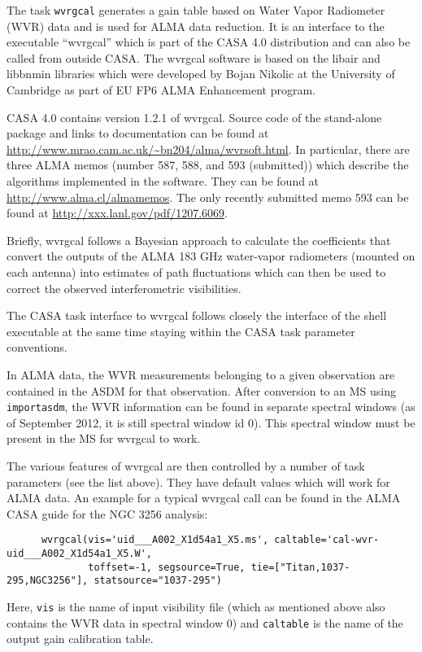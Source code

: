 The task {\tt wvrgcal} generates a gain table based on Water Vapor
Radiometer (WVR) data and is used for ALMA data reduction. It is an
interface to the executable ``wvrgcal'' which is part of the CASA 4.0
distribution and can also be called from outside CASA. The wvrgcal
software is based on the libair and libbnmin libraries which were
developed by Bojan Nikolic at the University of Cambridge as part of
EU FP6 ALMA Enhancement program.

CASA 4.0 contains version 1.2.1 of wvrgcal. Source code of the
stand-alone package and links to documentation can be found at
\url{http://www.mrao.cam.ac.uk/\~bn204/alma/wvrsoft.html}. In
particular, there are three ALMA memos (number 587, 588, and 593
(submitted)) which describe the algorithms implemented in the
software. They can be found at \url{http://www.alma.cl/almamemos}.
The only recently submitted memo 593 can be found at
\url{http://xxx.lanl.gov/pdf/1207.6069}.

Briefly, wvrgcal follows a Bayesian approach to calculate the
coefficients that convert the outputs of the ALMA 183 GHz water-vapor
radiometers (mounted on each antenna) into estimates of path
fluctuations which can then be used to correct the observed
interferometric visibilities.

The CASA task interface to wvrgcal follows closely the interface of
the shell executable at the same time staying within the CASA task
parameter conventions.

In ALMA data, the WVR measurements belonging to a given observation
are contained in the ASDM for that observation. After conversion to an
MS using {\tt importasdm}, the WVR information can be found in
separate spectral windows (as of September 2012, it is still spectral
window id 0).  This spectral window must be present in the MS for
wvrgcal to work.

The various features of wvrgcal are then controlled by a number of
task parameters (see the list above).  They have default values which
will work for ALMA data.  An example for a typical wvrgcal call can be
found in the ALMA CASA guide for the NGC 3256 analysis:

\small
\begin{verbatim}
      wvrgcal(vis='uid___A002_X1d54a1_X5.ms', caltable='cal-wvr-uid___A002_X1d54a1_X5.W',  
              toffset=-1, segsource=True, tie=["Titan,1037-295,NGC3256"], statsource="1037-295")
\end{verbatim}
\normalsize

Here, {\tt vis} is the name of input visibility file (which as
mentioned above also contains the WVR data in spectral window 0) and
{\tt caltable} is the name of the output gain calibration table.

